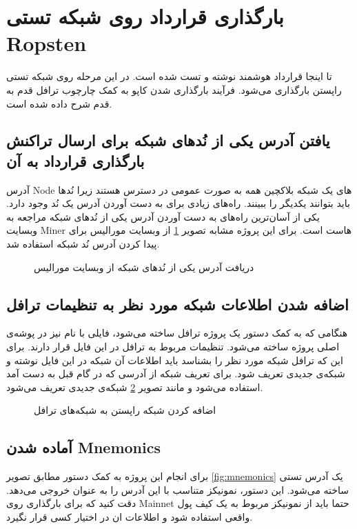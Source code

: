 \section{بارگذاری قرارداد روی شبکه تستی \gls{Ropsten}}
تا اینجا قرارداد هوشمند نوشته و تست شده است.
در این مرحله روی شبکه تستی راپستن بارگذاری می‌شود.
فرآیند بارگذاری شدن کاپو به کمک چارچوب ترافل قدم به قدم شرح داده شده است.

\subsection{یافتن آدرس یکی از نُد‌های شبکه برای ارسال تراکنش بارگذاری قرارداد به آن}
آدرس
\gls{Node}
های یک شبکه بلاکچین همه به صورت عمومی در دسترس هستند زیرا نُدها باید بتوانند یکدیگر را ببینند.
راه‌های زیادی برای به دست آوردن آدرس یک نُد وجود دارد.
یکی از آسان‌ترین راه‌های به دست آوردن آدرس یکی از نُد‌های شبکه مراجعه به وبسایت
\gls{Miner}
هاست است.
برای این پروژه مشابه تصویر
\ref{fig:moralis}
از وبسایت مورالیس
برای پیدا کردن آدرس نُد شبکه استفاده شد.

\begin{figure}
\centerline{}
\caption{دریافت آدرس یکی از نُد‌های شبکه از وبسایت مورالیس}
\label{fig:moralis}
\end{figure}

\subsection{اضافه شدن اطلاعات شبکه مورد نظر به تنظیمات ترافل}
هنگامی که به کمک دستور
یک پروژه ترافل ساخته می‌شود، فایلی با نام
نیز در پوشه‌ی اصلی پروژه ساخته می‌شود.
تنظیمات مربوط به ترافل در این فایل قرار دارند.
برای این که ترافل شبکه مورد نظر را بشناسد باید اطلاعات آن شبکه در این فایل نوشته و شبکه‌ی جدیدی تعریف شود.
برای تعریف شبکه از آدرسی که در گام قبل به دست آمد استفاده می‌شود و مانند تصویر
\ref{fig:network-config}
شبکه‌ی جدیدی تعریف می‌شود.

\begin{figure}
\centerline{}
\caption{اضافه کردن شبکه راپستن به شبکه‌های ترافل}
\label{fig:network-config}
\end{figure}


\subsection{آماده شدن \gls{Mnemonics}}
برای انجام این پروژه به کمک دستور
مطابق تصویر
\ref{fig:mnemonics}
یک آدرس تستی ساخته می‌شود.
این دستور، نمونیکز متناسب با این آدرس را به عنوان خروجی می‌دهد. دقت کنید که برای بارگذاری روی
\gls{Mainnet}
حتما باید از نمونیکز مربوط به یک کیف پول واقعی استفاده شود و اطلاعات ان در اختیار کسی قرار نگیرد.

